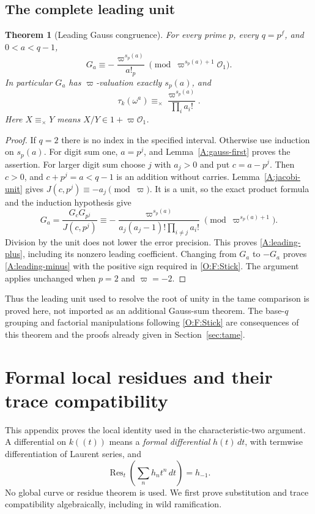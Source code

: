 \documentclass[11pt]{amsart}
\newtheorem{theorem}{Theorem}[section]
\theoremstyle{definition}
\theoremstyle{remark}
\newcommand{\Res}{\operatorname{Res}}
\newcommand{\OO}{\mathcal O}\newcommand{\pp}{\mathfrak p}\newcommand{\PP}{\mathfrak P}
\begin{document}
\subsection{The complete leading unit}
\begin{theorem}[Leading Gauss congruence]\label{A:leading-gauss}
For every prime $p$, every $q=p^f$, and $0<a<q-1$,
\begin{equation}\label{A:leading-plus}
 G_a\equiv-\frac{\varpi^{s_p(a)}}{a!_p}
                       \pmod{\varpi^{s_p(a)+1}\OO_1}.
\end{equation}
In particular $G_a$ has $\varpi$-valuation exactly $s_p(a)$, and
\begin{equation}\label{A:leading-minus}
 \tau_k(\omega^a)\equiv_\times
       \frac{\varpi^{s_p(a)}}{\prod_i a_i!}.
\end{equation}
Here $X\equiv_\times Y$ means $X/Y\in1+\varpi\OO_1$.
\end{theorem}
\begin{proof}
If $q=2$ there is no index in the specified interval. Otherwise use
induction on $s_p(a)$. For digit sum one, $a=p^j$, and
Lemma~\ref{A:gauss-first} proves the assertion.
For larger digit sum choose $j$ with $a_j>0$ and put $c=a-p^j$.
Then $c>0$, and $c+p^j=a<q-1$ is an addition without carries.
Lemma~\ref{A:jacobi-unit} gives $J(c,p^j)\equiv-a_j\pmod\varpi$.
It is a unit, so the exact product formula and the induction hypothesis
give
\[
 G_a=\frac{G_cG_{p^j}}{J(c,p^j)}
 \equiv-\frac{\varpi^{s_p(a)}}{
                a_j(a_j-1)!\prod_{i\ne j}a_i!}
                \pmod{\varpi^{s_p(a)+1}}.
\]
Division by the unit does not lower the error precision. This proves
\eqref{A:leading-plus}, including its nonzero leading coefficient.
Changing from $G_a$ to $-G_a$ proves \eqref{A:leading-minus} with the
positive sign required in \eqref{O:F:Stick}. The argument applies
unchanged when $p=2$ and $\varpi=-2$.
\end{proof}

Thus the leading unit used to resolve the root of unity in the tame
comparison is proved here, not imported as an additional Gauss-sum
theorem. The base-$q$ grouping and factorial manipulations following
\eqref{O:F:Stick} are consequences of this theorem and the proofs
already given in Section~\ref{sec:tame}.


\section{Formal local residues and their trace compatibility}\label{app:local-residues}
This appendix proves the local identity used in the characteristic-two
argument. A differential on $k((t))$ means a \emph{formal differential}
$h(t)\,dt$, with termwise differentiation of Laurent series, and
\[
 \Res_t\left(\sum_n h_nt^n\,dt\right)=h_{-1}.
\]
No global curve or residue theorem is used. We first prove substitution
and trace compatibility algebraically, including in wild ramification.
\end{document}
